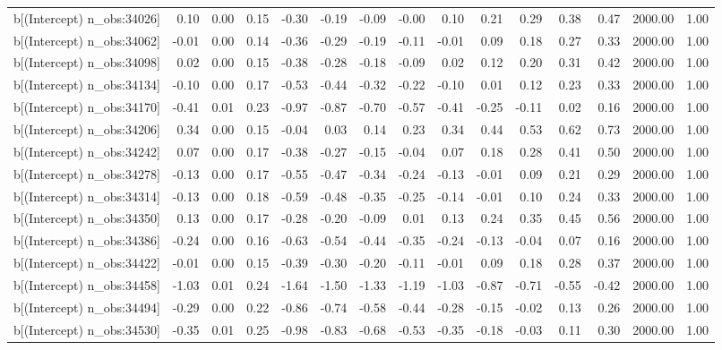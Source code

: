 \begin{table}[ht]
\begin{tabular}{rrrrrrrrrrrrrrr}
  b[(Intercept) n\_obs:34026] & 0.10 & 0.00 & 0.15 & -0.30 & -0.19 & -0.09 & -0.00 & 0.10 & 0.21 & 0.29 & 0.38 & 0.47 & 2000.00 & 1.00 \\ 
  b[(Intercept) n\_obs:34062] & -0.01 & 0.00 & 0.14 & -0.36 & -0.29 & -0.19 & -0.11 & -0.01 & 0.09 & 0.18 & 0.27 & 0.33 & 2000.00 & 1.00 \\ 
  b[(Intercept) n\_obs:34098] & 0.02 & 0.00 & 0.15 & -0.38 & -0.28 & -0.18 & -0.09 & 0.02 & 0.12 & 0.20 & 0.31 & 0.42 & 2000.00 & 1.00 \\ 
  b[(Intercept) n\_obs:34134] & -0.10 & 0.00 & 0.17 & -0.53 & -0.44 & -0.32 & -0.22 & -0.10 & 0.01 & 0.12 & 0.23 & 0.33 & 2000.00 & 1.00 \\ 
  b[(Intercept) n\_obs:34170] & -0.41 & 0.01 & 0.23 & -0.97 & -0.87 & -0.70 & -0.57 & -0.41 & -0.25 & -0.11 & 0.02 & 0.16 & 2000.00 & 1.00 \\ 
  b[(Intercept) n\_obs:34206] & 0.34 & 0.00 & 0.15 & -0.04 & 0.03 & 0.14 & 0.23 & 0.34 & 0.44 & 0.53 & 0.62 & 0.73 & 2000.00 & 1.00 \\ 
  b[(Intercept) n\_obs:34242] & 0.07 & 0.00 & 0.17 & -0.38 & -0.27 & -0.15 & -0.04 & 0.07 & 0.18 & 0.28 & 0.41 & 0.50 & 2000.00 & 1.00 \\ 
  b[(Intercept) n\_obs:34278] & -0.13 & 0.00 & 0.17 & -0.55 & -0.47 & -0.34 & -0.24 & -0.13 & -0.01 & 0.09 & 0.21 & 0.29 & 2000.00 & 1.00 \\ 
  b[(Intercept) n\_obs:34314] & -0.13 & 0.00 & 0.18 & -0.59 & -0.48 & -0.35 & -0.25 & -0.14 & -0.01 & 0.10 & 0.24 & 0.33 & 2000.00 & 1.00 \\ 
  b[(Intercept) n\_obs:34350] & 0.13 & 0.00 & 0.17 & -0.28 & -0.20 & -0.09 & 0.01 & 0.13 & 0.24 & 0.35 & 0.45 & 0.56 & 2000.00 & 1.00 \\ 
  b[(Intercept) n\_obs:34386] & -0.24 & 0.00 & 0.16 & -0.63 & -0.54 & -0.44 & -0.35 & -0.24 & -0.13 & -0.04 & 0.07 & 0.16 & 2000.00 & 1.00 \\ 
  b[(Intercept) n\_obs:34422] & -0.01 & 0.00 & 0.15 & -0.39 & -0.30 & -0.20 & -0.11 & -0.01 & 0.09 & 0.18 & 0.28 & 0.37 & 2000.00 & 1.00 \\ 
  b[(Intercept) n\_obs:34458] & -1.03 & 0.01 & 0.24 & -1.64 & -1.50 & -1.33 & -1.19 & -1.03 & -0.87 & -0.71 & -0.55 & -0.42 & 2000.00 & 1.00 \\ 
  b[(Intercept) n\_obs:34494] & -0.29 & 0.00 & 0.22 & -0.86 & -0.74 & -0.58 & -0.44 & -0.28 & -0.15 & -0.02 & 0.13 & 0.26 & 2000.00 & 1.00 \\ 
  b[(Intercept) n\_obs:34530] & -0.35 & 0.01 & 0.25 & -0.98 & -0.83 & -0.68 & -0.53 & -0.35 & -0.18 & -0.03 & 0.11 & 0.30 & 2000.00 & 1.00 \\ 

\end{tabular}
\end{table}
